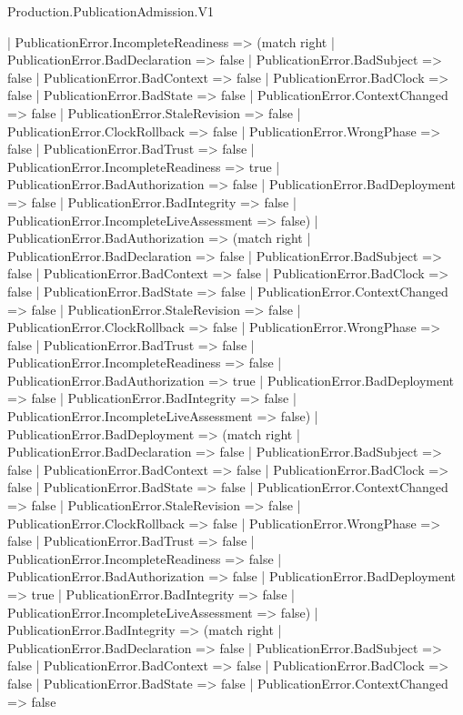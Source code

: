 \begin{lexlean}{Production.PublicationAdmission.V1}
\begin{semanticmodule}
{    | PublicationError.IncompleteReadiness => (match right
      | PublicationError.BadDeclaration => false
      | PublicationError.BadSubject => false
      | PublicationError.BadContext => false
      | PublicationError.BadClock => false
      | PublicationError.BadState => false
      | PublicationError.ContextChanged => false
      | PublicationError.StaleRevision => false
      | PublicationError.ClockRollback => false
      | PublicationError.WrongPhase => false
      | PublicationError.BadTrust => false
      | PublicationError.IncompleteReadiness => true
      | PublicationError.BadAuthorization => false
      | PublicationError.BadDeployment => false
      | PublicationError.BadIntegrity => false
      | PublicationError.IncompleteLiveAssessment => false)
    | PublicationError.BadAuthorization => (match right
      | PublicationError.BadDeclaration => false
      | PublicationError.BadSubject => false
      | PublicationError.BadContext => false
      | PublicationError.BadClock => false
      | PublicationError.BadState => false
      | PublicationError.ContextChanged => false
      | PublicationError.StaleRevision => false
      | PublicationError.ClockRollback => false
      | PublicationError.WrongPhase => false
      | PublicationError.BadTrust => false
      | PublicationError.IncompleteReadiness => false
      | PublicationError.BadAuthorization => true
      | PublicationError.BadDeployment => false
      | PublicationError.BadIntegrity => false
      | PublicationError.IncompleteLiveAssessment => false)
    | PublicationError.BadDeployment => (match right
      | PublicationError.BadDeclaration => false
      | PublicationError.BadSubject => false
      | PublicationError.BadContext => false
      | PublicationError.BadClock => false
      | PublicationError.BadState => false
      | PublicationError.ContextChanged => false
      | PublicationError.StaleRevision => false
      | PublicationError.ClockRollback => false
      | PublicationError.WrongPhase => false
      | PublicationError.BadTrust => false
      | PublicationError.IncompleteReadiness => false
      | PublicationError.BadAuthorization => false
      | PublicationError.BadDeployment => true
      | PublicationError.BadIntegrity => false
      | PublicationError.IncompleteLiveAssessment => false)
    | PublicationError.BadIntegrity => (match right
      | PublicationError.BadDeclaration => false
      | PublicationError.BadSubject => false
      | PublicationError.BadContext => false
      | PublicationError.BadClock => false
      | PublicationError.BadState => false
      | PublicationError.ContextChanged => false
}
\end{semanticmodule}
\end{lexlean}
